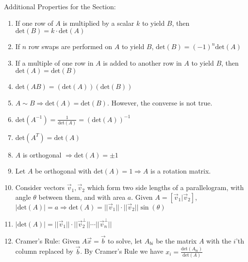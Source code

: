 \documentclass[11pt]{article}
\begin{document}
\noindent
Additional Properties for the Section:
\begin{enumerate}
\item If one row of $A$ is multiplied by a scalar $k$ to yield $B$, then $\text{det}(B)=k\cdot\text{det}(A)$
\item If $n$ row swaps are performed on $A$ to yield $B$, $\text{det}(B)=(-1)^n\text{det}(A)$
\item If a multiple of one row in $A$ is added to another row in $A$ to yield $B$, then $\text{det}(A)=\text{det}(B)$
\item det$(AB)=(\text{det}(A))(\text{det}(B))$
\item $A\sim B\Rightarrow \text{det}(A)=\text{det}(B)$. However, the converse is not true.
\item det$(A^{-1})=\frac{1}{\text{det}(A)}=(\text{det}(A))^{-1}$
\item det$(A^T)=\text{det}(A)$
\item $A$ is orthogonal $\Rightarrow\text{det}(A)=\pm 1$
\item Let $A$ be orthogonal with det$(A)=1\Rightarrow A$ is a rotation matrix.
\item Consider vectors $\vec{v}_1,\vec{v}_2$ which form two side lengths of a parallelogram, with angle $\theta$ between them, and with area $a$. Given $A=[\vec{v}_1|\vec{v}_2]$, $|\text{det}(A)|=a\Rightarrow \text{det}(A)=||\vec{v}_1||\cdot ||\vec{v}_2||\sin(\theta)$
\item $|\text{det}(A)|=||\vec{v}_1||\cdot||\vec{v}_2^\perp||\cdots ||\vec{v}_n^\perp||$
\item Cramer's Rule: Given $A\vec{x}=\vec{b}$ to solve, let $A_{bi}$ be the matrix $A$ with the $i$'th column replaced by $\vec{b}$. By Cramer's Rule we have $x_i=\frac{\text{det}(A_{bi})}{\text{det}(A)}$
\end{enumerate}
\end{document}
